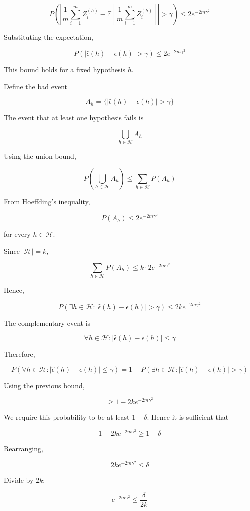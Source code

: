 \documentclass[12pt]{article}
\begin{document}
\[
P\left(
\left|
\frac{1}{m}\sum_{i=1}^{m} Z_i^{(h)}
-
\mathbb E\left[
\frac{1}{m}\sum_{i=1}^{m} Z_i^{(h)}
\right]
\right|
>
\gamma
\right)
\leq
2e^{-2m\gamma^2}
\]

Substituting the expectation,

\[
P\left(
|\hat{\epsilon}(h)-\epsilon(h)|
>
\gamma
\right)
\leq
2e^{-2m\gamma^2}
\]

This bound holds for a fixed hypothesis \(h\).

Define the bad event

\[
A_h
=
\{
|\hat{\epsilon}(h)-\epsilon(h)|
>
\gamma
\}
\]

The event that at least one hypothesis fails is

\[
\bigcup_{h\in\mathcal H} A_h
\]

Using the union bound,

\[
P\left(
\bigcup_{h\in\mathcal H} A_h
\right)
\leq
\sum_{h\in\mathcal H} P(A_h)
\]

From Hoeffding's inequality,

\[
P(A_h)
\leq
2e^{-2m\gamma^2}
\]

for every \(h\in\mathcal H\).

Since \(|\mathcal H|=k\),

\[
\sum_{h\in\mathcal H} P(A_h)
\leq
k \cdot 2e^{-2m\gamma^2}
\]

Hence,

\[
P\left(
\exists h\in\mathcal H :
|\hat{\epsilon}(h)-\epsilon(h)|
>
\gamma
\right)
\leq
2k e^{-2m\gamma^2}
\]

The complementary event is

\[
\forall h\in\mathcal H :
|\hat{\epsilon}(h)-\epsilon(h)|
\leq
\gamma
\]

Therefore,

\[
P\left(
\forall h\in\mathcal H :
|\hat{\epsilon}(h)-\epsilon(h)|
\leq
\gamma
\right)
=
1-
P\left(
\exists h\in\mathcal H :
|\hat{\epsilon}(h)-\epsilon(h)|
>
\gamma
\right)
\]

Using the previous bound,

\[
\geq
1-2k e^{-2m\gamma^2}
\]

We require this probability to be at least \(1-\delta\). Hence it is sufficient that

\[
1-2k e^{-2m\gamma^2}
\geq
1-\delta
\]

Rearranging,

\[
2k e^{-2m\gamma^2}
\leq
\delta
\]

Divide by \(2k\):

\[
e^{-2m\gamma^2}
\leq
\frac{\delta}{2k}
\]
\end{document}
